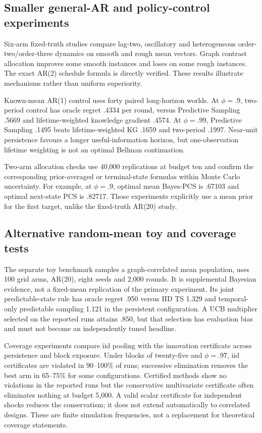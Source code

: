 \subsection{Smaller general-AR and policy-control experiments}
Six-arm fixed-truth studies compare lag-two, oscillatory and heterogeneous order-two/order-three dynamics on smooth and rough mean vectors. Graph contrast allocation improves some smooth instances and loses on some rough instances. The exact AR(2) schedule formula is directly verified. These results illustrate mechanisms rather than uniform superiority.

Known-mean AR(1) control uses forty paired long-horizon worlds. At $\phi=.9$, two-period control has oracle regret .4334 per round, versus Predictive Sampling .5669 and lifetime-weighted knowledge gradient .4574. At $\phi=.99$, Predictive Sampling .1495 beats lifetime-weighted KG .1659 and two-period .1997. Near-unit persistence favours a longer useful-information horizon, but one-observation lifetime weighting is not an optimal Bellman continuation.

Two-arm allocation checks use 40,000 replications at budget ten and confirm the corresponding prior-averaged or terminal-state formulas within Monte Carlo uncertainty. For example, at $\phi=.9$, optimal mean Bayes-PCS is .67103 and optimal next-state PCS is .82717. Those experiments explicitly use a mean prior for the first target, unlike the fixed-truth AR(20) study.

\subsection{Alternative random-mean toy and coverage tests}
The separate toy benchmark samples a graph-correlated mean population, uses 100 grid arms, AR(20), eight seeds and 2,000 rounds. It is supplemental Bayesian evidence, not a fixed-mean replication of the primary experiment. Its joint predictable-state rule has oracle regret .950 versus IID TS 1.329 and temporal-only predictable sampling 1.121 in the persistent configuration. A UCB multiplier selected on the reported runs attains .850, but that selection has evaluation bias and must not become an independently tuned headline.

Coverage experiments compare iid pooling with the innovation certificate across persistence and block exposure. Under blocks of twenty-five and $\phi=.97$, iid certificates are violated in 90--100\% of runs; successive elimination removes the best arm in 65--75\% for some configurations. Certified methods show no violations in the reported runs but the conservative multivariate certificate often eliminates nothing at budget 5,000. A valid scalar certificate for independent shocks reduces the conservatism; it does not extend automatically to correlated designs. These are finite simulation frequencies, not a replacement for theoretical coverage statements.

